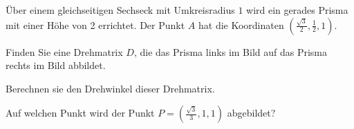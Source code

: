 Über einem gleichseitigen Sechseck mit Umkreisradius $1$ 
wird ein gerades Prisma mit einer Höhe von 2 errichtet.
Der Punkt $A$ hat die Koordinaten 
$\left(\frac{\sqrt{3}}{2},\frac{1}{2},1\right)$.

\begin{center}
\end{center}

\begin{teilaufgaben}
\item
Finden Sie eine Drehmatrix $D$, die das Prisma links im Bild auf das
Prisma rechts im Bild abbildet.
\item
Berechnen sie den Drehwinkel dieser Drehmatrix.
\item 
Auf welchen Punkt wird der Punkt $P=(\frac{\sqrt{3}}{3},1,1)$ abgebildet?
\end{teilaufgaben}

\begin{hinweis}
\end{hinweis}


